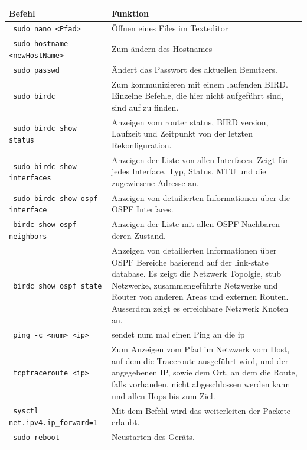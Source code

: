 \documentclass[11pt,titlepage]{article}
\begin{document}
\par\medskip 

\begin{tabular}{ |p{4cm}|p{10cm}|}
  \hline
  \textbf{Befehl} & \textbf{Funktion} \\
  \hline
  \lstinline! sudo nano <Pfad> ! & Öffnen eines Files im Texteditor \\
  \hline
  \lstinline! sudo hostname <newHostName>! & Zum ändern des Hostnames \\
  \hline
  \lstinline! sudo passwd! & Ändert das Passwort des aktuellen Benutzers. \\
  \hline
  \lstinline! sudo birdc ! & Zum kommunizieren mit einem laufenden BIRD. Einzelne Befehle, die hier nicht aufgeführt sind, sind auf \cite{BIRD_COMMAND} zu finden. \\
  \hline
  \lstinline! sudo birdc show status ! & Anzeigen vom router status, BIRD version, Laufzeit und Zeitpunkt von der letzten Rekonfiguration. \\
  \hline
  \lstinline! sudo birdc show interfaces ! & Anzeigen der Liste von allen Interfaces. Zeigt für jedes Interface, Typ, Status, MTU und die zugewiesene Adresse an.\\
  \hline
  \lstinline! sudo birdc show ospf interface ! & Anzeigen von detailierten Informationen über die OSPF Interfaces. \\
  \hline
  \lstinline! birdc show ospf neighbors ! & Anzeigen der Liste mit allen OSPF Nachbaren deren Zustand. \\
  \hline
  \lstinline! birdc show ospf state ! & Anzeigen von detailierten Informationen über OSPF Bereiche basierend auf der link-state database. Es zeigt die Netzwerk Topolgie, stub Netzwerke, zusammengeführte Netzwerke und Router von anderen Areas und externen Routen. Ausserdem zeigt es erreichbare Netzwerk Knoten an. \\
  \hline
  \lstinline! ping -c <num> <ip> ! & sendet num mal einen Ping an  die ip \\
  \hline
  \lstinline! tcptraceroute <ip> ! & Zum Anzeigen vom Pfad im Netzwerk vom Host, auf dem die Traceroute ausgeführt wird, und der angegebenen IP, sowie dem Ort, an dem die Route, falls vorhanden, nicht abgeschlossen werden kann und allen Hops bis zum Ziel. \\
  \hline
  \lstinline! sysctl net.ipv4.ip_forward=1 ! & Mit dem Befehl wird das weiterleiten der Packete erlaubt. \\
  \hline
  \lstinline! sudo reboot ! & Neustarten des Geräts. \\ 

\end{tabular}
\end{document}
